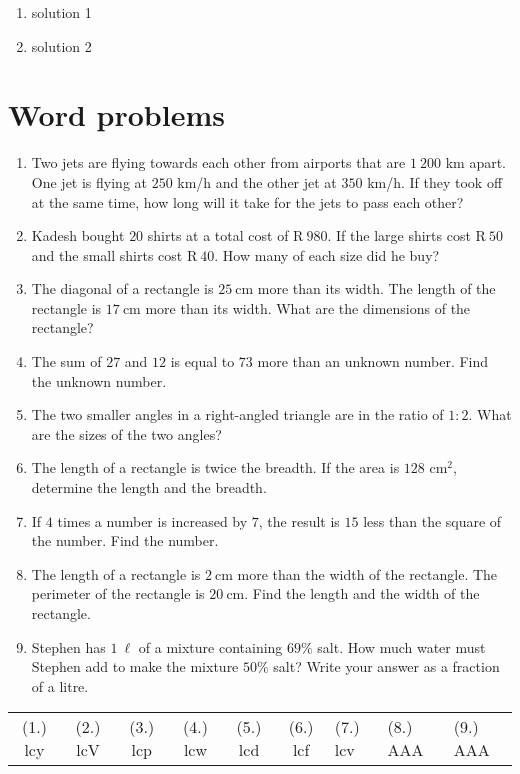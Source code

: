  \begin{solutions}{}{
\begin{enumerate}[itemsep=5pt, label=\textbf{\arabic*}. ] 


\item solution 1
\item solution 2

\end{enumerate}}
\end{solutions}


\section{Word problems}
\begin{exercises}{}
{
\begin{enumerate}[noitemsep, label=\textbf{\arabic*}. ] 
\item Two jets are flying towards each other from airports that are $1~200$ km apart. One jet is flying at $250$ km/h and the other jet at $350$ km/h. If they took off at the same time, how long will it take for the jets to pass each other?
\item Kadesh bought $20$ shirts at a total cost of R$~980$. If the
  large shirts cost R$~50$ and the small shirts cost R$~40$. How many
  of each size did he buy?
\item The diagonal of a rectangle is $25~$cm more than its width. The length of the rectangle is $17~$cm more than its width. What are the dimensions of the rectangle?  
\item The sum of $27$ and $12$ is equal to $73$ more than an unknown number. Find the unknown number.
\item The two smaller angles in a right-angled triangle are in the ratio of $1:2$. What are the sizes of the two angles? 
\item The length of a rectangle is twice the breadth. If the area is $128$ cm$^{2}$, determine the length and the breadth.       
\item If $4$ times a number is increased by $7$, the result is $15$ less than the square of the number. Find the number.
\item The length of a rectangle is $2~$cm more than the width of the rectangle. The perimeter of the rectangle is $20~$cm. Find the length and the width of the rectangle.
\item Stephen has $1~\ell{}$ of a mixture containing $69\%$ salt. How much water must Stephen add to make the mixture $50\%$ salt? Write your answer as a fraction of a litre.
\end{enumerate}
\practiceinfo
\par 
\par \begin{tabular}[h]{cccccc}
(1.) lcy  &  (2.) lcV  &  (3.) lcp  &  (4.) lcw  &  (5.) lcd  &  (6.) lcf  &  (7.) lcv  & (8.) AAA & (9.) AAA \end{tabular}
}
\end{exercises}


